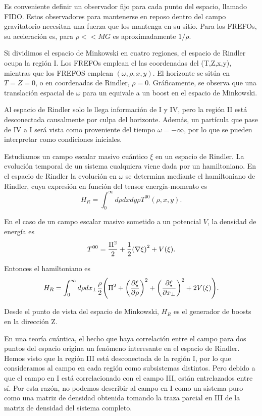 Es conveniente definir un observador fijo para cada punto del espacio, llamado
FIDO. Estos observadores para mantenerse
en reposo dentro del campo gravitatorio necesitan una fuerza que los mantenga
en su sitio. Para los FREFOs, su aceleración es, para $\rho<<MG$ es aproximadamente $1/\rho$.

Si dividimos el espacio de Minkowski en cuatro regiones, el espacio de Rindler ocupa
la región I. Los FREFOs emplean el las coordenadas del (T,Z,x,y), mientras que
los FREFOS emplean $(\omega, \rho, x, y)$. El horizonte se sitúa en $T=Z=0$, o
en coordenadas de Rindler, $\rho=0$.
Gráficamente, se observa que una translación espacial de $\omega$ para un equivale
a un boost en el espacio de Minkowski.

Al espacio de Rindler solo le llega información de I y IV, pero la región II está 
desconectada causalmente por culpa del horizonte.
Además, un partícula que pase de IV a I será vista como proveniente del tiempo 
$\omega=-\infty$, por lo que se pueden interpretar como condiciones iniciales.

Estudiamos un campo escalar masivo cuántico $\xi$ en un espacio de Rindler.
La evolución temporal de un sistema cualquiera viene dada por un hamiltoniano. En el
espacio de Rindler la evolución en $\omega$ se determina mediante el hamiltoniano de
Rindler, cuya expresión en función del tensor energía-momento es
\begin{equation}
  H_R=\int_0^\infty d\rho dxdy \rho T^{00} (\rho, x, y).
\end{equation}

En el caso de un campo escalar masivo sometido a un potencial $V$, la densidad de energía
es
\begin{equation}
  T^{00}=\frac{\Pi^2}{2}+\frac{1}{2}\qty(\nabla \xi)^2+V(\xi).
\end{equation}

Entonces el hamiltoniano es
\begin{equation}
  H_R=\int_0^\infty d\rho dx_\perp \frac{\rho}{2}\qty(\Pi^2+\qty(\pdv{\xi}{\rho})^2+\qty(\pdv{\xi}{x_\perp})^2+2V(\xi)).
\end{equation}

Desde el punto de vista del espacio de Minkowski, $H_R$ es el generador de boosts en 
la dirección Z.

En una teoría cuántica, el hecho que haya correlación entre el campo para dos puntos
del espacio origina un fenómeno interesante en el espacio de Rindler. 
Hemos visto que la región III está desconectada de la región I, por lo que consideramos
al campo en cada región como subsistemas distintos. Pero debido a que el campo en I está
correlacionado con el campo III, están entrelazados entre sí.
Por esta razón, no podemos describir al campo en I como un sistema puro como una
matriz de densidad obtenida tomando la traza parcial en III de la matriz de densidad
del sistema completo.

